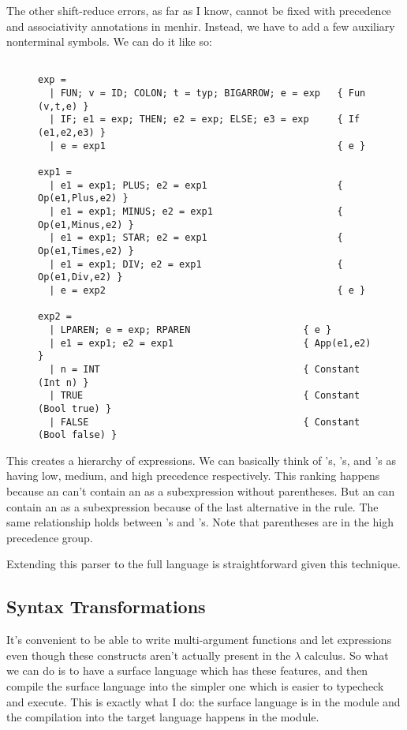 \documentclass[pageno]{jpaper}
\begin{document}
{{{The other shift-reduce errors, as far as I know, cannot be fixed with precedence and associativity annotations
in menhir.  Instead, we have to add a few auxiliary nonterminal symbols.  We can do it like so:

\FloatBarrier
\begin{figure}
\begin{lstlisting}

exp =
  | FUN; v = ID; COLON; t = typ; BIGARROW; e = exp   { Fun (v,t,e) }
  | IF; e1 = exp; THEN; e2 = exp; ELSE; e3 = exp     { If (e1,e2,e3) }
  | e = exp1                                         { e }
 
exp1 = 
  | e1 = exp1; PLUS; e2 = exp1                       { Op(e1,Plus,e2) }
  | e1 = exp1; MINUS; e2 = exp1                      { Op(e1,Minus,e2) }
  | e1 = exp1; STAR; e2 = exp1                       { Op(e1,Times,e2) }
  | e1 = exp1; DIV; e2 = exp1                        { Op(e1,Div,e2) }
  | e = exp2                                         { e }

exp2 =
  | LPAREN; e = exp; RPAREN                    { e }
  | e1 = exp1; e2 = exp1                       { App(e1,e2) }
  | n = INT                                    { Constant (Int n) }
  | TRUE                                       { Constant (Bool true) }
  | FALSE                                      { Constant (Bool false) }

\end{lstlisting}
\end{figure}
\FloatBarrier

This creates a hierarchy of expressions.  We can basically think of 's, 's, and 's as having low, medium, and high precedence respectively.
This ranking happens because an  can't contain an  as a subexpression without
parentheses. But an  can contain an  as a subexpression because of the last
alternative in the  rule.  The same relationship holds between 's and
's.  Note that parentheses are in the high precedence group.

Extending this parser to the full language is straightforward given this technique.


\subsection{Syntax Transformations}

It's convenient to be able to write multi-argument functions and let expressions
even though these constructs aren't actually present in the $\lambda$ calculus.
So what we can do is to have a surface language which has these features, and then compile
the surface language into the simpler one which is easier to typecheck and execute.
This is exactly what I do: the surface language is in the module
 and the compilation into the target language happens in the  module.

}}}
\end{document}
